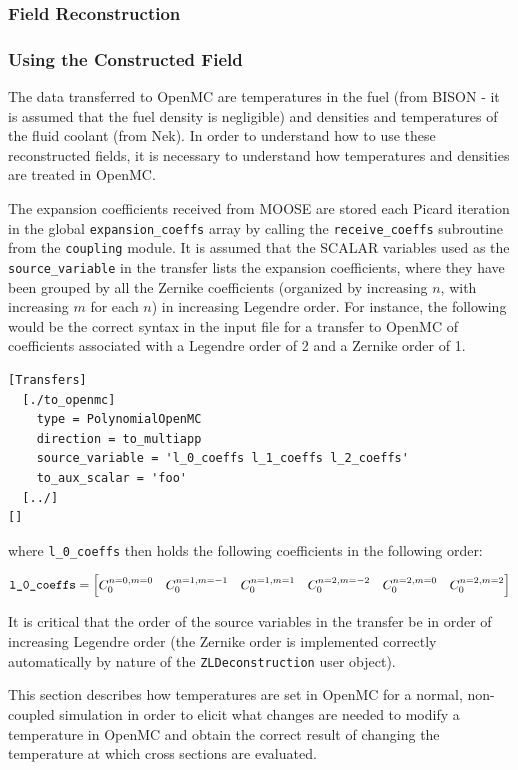 \documentclass[10pt]{article}
\newcommand{\beq}{\begin{equation}}
\newcommand{\eeq}{\end{equation}}
\newcounter{subsubsubsection}[subsubsection]
\numberwithin{equation}{section} %
\begin{document}
\subsubsection{Field Reconstruction}

\subsubsection{Using the Constructed Field}
The data transferred to OpenMC are temperatures in the fuel (from BISON - it is assumed that the fuel density is negligible) and densities and temperatures of the fluid coolant (from Nek). In order to understand how to use these reconstructed fields, it is necessary to understand how temperatures and densities are treated in OpenMC.

The expansion coefficients received from MOOSE are stored each Picard iteration in the global {\tt expansion\_coeffs} array by calling the {\tt receive\_coeffs} subroutine from the {\tt coupling} module. It is assumed that the SCALAR variables used as the {\tt source\_variable} in the transfer lists the expansion coefficients, where they have been grouped by all the Zernike coefficients (organized by increasing \(n\), with increasing \(m\) for each \(n\)) in increasing Legendre order. For instance, the following would be the correct syntax in the input file for a transfer to OpenMC of coefficients associated with a Legendre order of 2 and a Zernike order of 1.

\begin{lstlisting}
[Transfers]
  [./to_openmc]
    type = PolynomialOpenMC
    direction = to_multiapp
    source_variable = 'l_0_coeffs l_1_coeffs l_2_coeffs'
    to_aux_scalar = 'foo'
  [../]
[]
\end{lstlisting}

where {\tt l\_0\_coeffs} then holds the following coefficients in the following order:

\beq
\textrm{{\tt l\_0\_coeffs}}= \begin{bmatrix}C_0^{n=0,m=0} & C_0^{n=1, m=-1} & C_0^{n=1,m=1} & C_0^{n=2,m=-2} & C_0^{n=2,m=0} & C_0^{n=2,m=2}\end{bmatrix}
\eeq

It is critical that the order of the source variables in the transfer be in order of increasing Legendre order (the Zernike order is implemented correctly automatically by nature of the {\tt ZLDeconstruction} user object). 

This section describes how temperatures are set in OpenMC for a normal, non-coupled simulation in order to elicit what changes are needed to modify a temperature in OpenMC and obtain the correct result of changing the temperature at which cross sections are evaluated.
\end{document}
